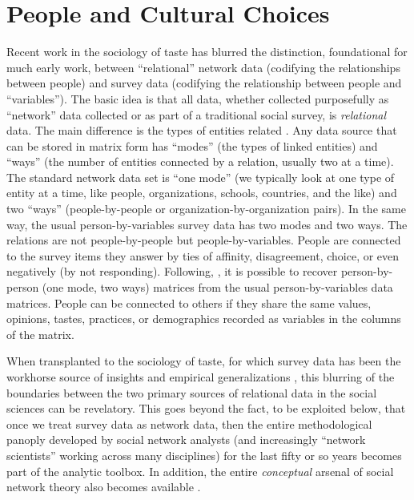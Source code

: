 \documentclass[a4paper,12pt]{article}
\begin{document}
\section{People and Cultural Choices}
Recent work in the sociology of taste has blurred the distinction, foundational for much early work, between ``relational'' network data (codifying the relationships between people) and survey data (codifying the relationship between people and ``variables''). The basic idea is that all data, whether collected purposefully as ``network'' data collected or as part of a traditional social survey, is \textit{relational} data. The main difference is the types of entities related \citep{borgatti_everett97}. Any data source that can be stored in matrix form has ``modes'' (the types of linked entities) and ``ways'' (the number of entities connected by a relation, usually two at a time). The standard network data set is ``one mode'' (we typically look at one type of entity at a time, like people, organizations, schools, countries, and the like) and two ``ways'' (people-by-people or organization-by-organization pairs). In the same way, the usual person-by-variables survey data has two modes and two ways. The relations are not people-by-people but people-by-variables. People are connected to the survey items they answer by ties of affinity, disagreement, choice, or even negatively (by not responding). Following, \citet{breiger74}, it is possible to recover person-by-person (one mode, two ways) matrices from the usual person-by-variables data matrices. People can be connected to others if they share the same values, opinions, tastes, practices, or demographics recorded as variables in the columns of the matrix. 

When transplanted to the sociology of taste, for which survey data has been the workhorse source of insights and empirical generalizations \citep{peterson_kern96, bryson96, vaneijck01,savage_gayo11}, this blurring of the boundaries between the two primary sources of relational data in the social sciences can be revelatory. This goes beyond the fact, to be exploited below, that once we treat survey data as network data, then the entire methodological panoply developed by social network analysts (and increasingly ``network scientists'' working across many disciplines) for the last fifty or so years becomes part of the analytic toolbox. In addition, the entire \textit{conceptual} arsenal of social network theory also becomes available \citep[244]{borgatti_everett97}.
\end{document}
